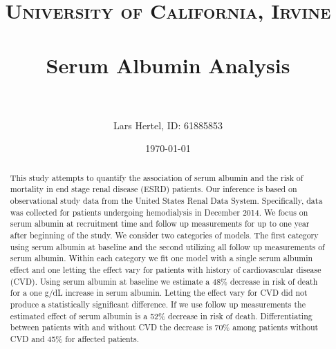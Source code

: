 \documentclass[paper=a4, fontsize=11pt]{scrartcl} %
\title{	
\normalfont \normalsize 
\textsc{University of California, Irvine} \\ [25pt] %
\horrule{0.5pt} \\[0.4cm] %
\huge Serum Albumin Analysis\\ %
\horrule{2pt} \\[0.5cm] %
}
\author{Lars Hertel,
	ID: 61885853\\} %
\date{\normalsize\today} %
\numberwithin{equation}{section} %
\numberwithin{figure}{section} %
\numberwithin{table}{section} %
\begin{document}
\maketitle %

\begin{abstract}
This study attempts to quantify the association of serum albumin and the risk of mortality in end stage renal disease (ESRD) patients. Our inference is based on observational study data from the United States Renal Data System. Specifically, data was collected for patients undergoing hemodialysis in December 2014. We focus on serum albumin at recruitment time and follow up measurements for up to one year after beginning of the study. We consider two categories of models. The first category using serum albumin at baseline and the second utilizing all follow up measurements of serum albumin. Within each category we fit one model with a single serum albumin effect and one letting the effect vary for patients with history of cardiovascular disease (CVD). Using serum albumin at baseline we estimate a 48\% decrease in risk of death for a one g/dL increase in serum albumin. Letting the effect vary for CVD did not produce a statistically significant difference. If we use follow up measurements the estimated effect of serum albumin is a 52\% decrease in risk of death. Differentiating between patients with and without CVD the decrease is 70\% among patients without CVD and 45\% for affected patients.
\end{abstract}
\end{document}
